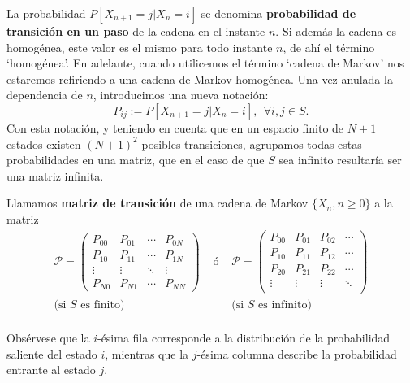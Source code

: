 La probabilidad $P[X_{n+1}=j|X_n=i]$ se denomina \textbf{probabilidad de transición en un paso} de la cadena en el instante $n$. Si además la cadena es homogénea, este valor es el mismo para todo instante $n$, de ahí el término `homogénea'. En adelante, cuando utilicemos el término `cadena de Markov' nos estaremos refiriendo a una cadena de Markov homogénea. Una vez anulada la dependencia de $n$, introducimos una nueva notación:
$$
P_{ij} := P[X_{n+1}=j|X_n=i], \ \ \forall i,j \in S.
$$
Con esta notación, y teniendo en cuenta que en un espacio finito de $N+1$ estados existen $(N+1)^2$ posibles transiciones, agrupamos todas estas probabilidades en una matriz, que en el caso de que $S$ sea infinito resultaría ser una matriz infinita.

\begin{definicion}
    Llamamos \textbf{matriz de transición} de una cadena de Markov $\{X_n, n\geq 0\}$ a la matriz
    \begin{equation}
        \label{eq:matriz-trans}
        \begin{array}{ccc}
            \mathcal P =\begin{pmatrix}
                P_{00} & P_{01} & \cdots & P_{0N} \\
                P_{10} & P_{11} & \cdots & P_{1N} \\
                \vdots & \vdots & \ddots & \vdots \\
                P_{N0} & P_{N1} & \cdots & P_{NN}  
            \end{pmatrix} & \text{ ó } &
            \mathcal P =\begin{pmatrix}
                P_{00} & P_{01} & P_{02} & \cdots  \\
                P_{10} & P_{11} & P_{12} & \cdots  \\
                P_{20} & P_{21} & P_{22} & \cdots  \\
                \vdots & \vdots & \vdots & \ddots  \\ 
            \end{pmatrix} \\
            \text{(si }S\text{ es finito)} & & \text{(si }S\text{ es infinito)}\\
        \end{array}
    \end{equation}
\end{definicion}

\begin{observacion}
    Obsérvese que la $i$-ésima fila corresponde a la distribución de la probabilidad saliente del estado $i$, mientras que la $j$-ésima columna describe la probabilidad entrante al estado $j$.
\end{observacion}

